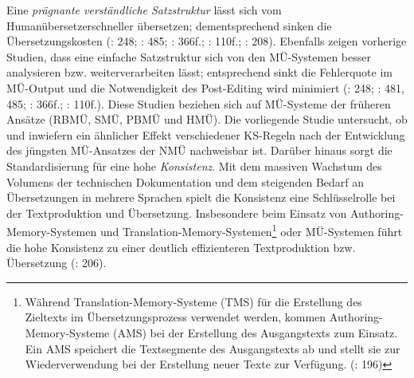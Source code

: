 Eine \textit{prägnante verständliche Satzstruktur} lässt sich vom Humanübersetzer\linebreak schneller übersetzen; dementsprechend sinken die Übersetzungskosten (\citealt{NybergEtAl2003}: 248; \citealt{Göpferich2007b}: 485; \citealt{Göpferich2008}: 366f.; \citealt{LehrndorferReuther2008}: 110f.; \citealt{DrewerZiegler2014}: 208). Ebenfalls zeigen vorherige Studien, dass eine einfache Satzstruktur sich von den MÜ-Systemen besser analysieren bzw. weiterverarbeiten lässt; entsprechend sinkt die Fehlerquote im MÜ-Output und die Notwendigkeit des Post-Editing wird minimiert (\citealt{NybergEtAl2003}: 248; \citealt{Göpferich2007b}: 481, 485; \citealt{Göpferich2008}: 366f.; \citealt{LehrndorferReuther2008}: 110f.). Diese Studien beziehen sich auf MÜ-Systeme der früheren Ansätze (RBMÜ, SMÜ, PBMÜ und HMÜ). Die vorliegende Studie untersucht, ob und inwiefern ein ähnlicher Effekt verschiedener KS-Regeln nach der Entwicklung des jüngsten MÜ\nobreakdash-An\-sa\-tzes der NMÜ nachweisbar ist. Darüber hinaus sorgt die Standardisierung für eine hohe \textit{Konsistenz}. Mit dem massiven Wachstum des Volumens der technischen Dokumentation und dem steigenden Bedarf an Übersetzungen in mehrere Sprachen spielt die Konsistenz eine Schlüsselrolle bei der Textproduktion und Übersetzung. Insbesondere beim Einsatz von Authoring-Memory-Systemen und Translation-Memory-Systemen\footnote{\textrm{Während Translation-Memory-Systeme (TMS) für die Erstellung des Zieltexts im Übersetzungsprozess verwendet werden, kommen Authoring-Memory-Systeme (AMS) bei der Erstellung des Ausgangstexts zum Einsatz. Ein AMS speichert die Textsegmente des Ausgangstexts ab und stellt sie zur Wiederverwendung bei der Erstellung neuer Texte zur Verfügung. (\citealt{DrewerSchmitz2017}: 196)} } oder MÜ-Systemen führt die hohe Konsistenz zu einer deutlich effizienteren Textproduktion bzw. Übersetzung (\citealt{DrewerZiegler2014}: 206).

